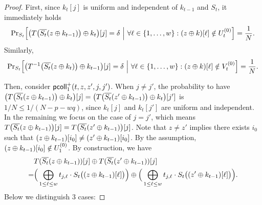 \begin{proof}
First, since $k_t[j]$ is uniform and independent of $k_{t-1}$ and $S_t$, it immediately holds
$${\Pr}_{S_t}\Big[\big(T\big(\overline{S_t}(z\oplus k_{t-1})\big)\oplus k_t\big)[j]=\delta ~\Big|~\forall\ell\in\{1,\ldots,w\}:(z\oplus k)[\ell]\notin U_t^{(0)}\Big]=\frac{1}{N}.$$
Similarly,
$${\Pr}_{S_t}\Big[\big(T^{-1}\big(\overline{S_t}(z\oplus k_t)\big)\oplus k_{t-1}\big)[j]=\delta ~\Big|~\forall\ell\in\{1,\ldots,w\}:(z\oplus k)[\ell]\notin V_t^{(0)}\Big]=\frac{1}{N}.$$



%
%
%
%
	
	
	
\arrangespace

	
Then, consider $\mathsf{pcoll}_{1}^+(t,z,z',j,j')$. When $j\neq j'$, the probability to have
$\big(T\big(\overline{S_t}(z\oplus k_{t-1})\big)\oplus k_t\big)[j]=\big(T\big(\overline{S_t}(z'\oplus k_{t-1})\big)\oplus k_t\big)[j']$ is $1/N\leq 1/(N-p-wq)$, since $k_t[j]$ and $k_t[j']$ are uniform and independent. In the remaining we focus on the case of $j=j'$, which means $T\big(\overline{S_t}(z\oplus k_{t-1})\big)[j]=T\big(\overline{S_t}(z'\oplus k_{t-1})\big)[j]$. Note that $z\neq z'$ implies there exists $i_0$ such that $(z\oplus k_{t-1})[i_0]\neq(z'\oplus k_{t-1})[i_0]$. By the assumption, $(z\oplus k_{t-1})[i_0]\notin U_1^{(0)}$. By construction, we have
%
\begin{align*}
&  T(\overline{S_t}(z\oplus k_{t-1}))[j]\oplus T(\overline{S_t}(z'\oplus k_{t-1}))[j]       \\
= &
\Big(\bigoplus_{1\leq\ell\leq w}t_{j,\ell}\cdot S_t\big((z\oplus k_{t-1})[\ell]\big)\Big)\oplus
\Big(\bigoplus_{1\leq\ell\leq w}t_{j,\ell}\cdot S_t\big((z'\oplus k_{t-1})[\ell]\big)\Big)   .
\end{align*}
%
Below we distinguish 3 cases:






\end{proof}
